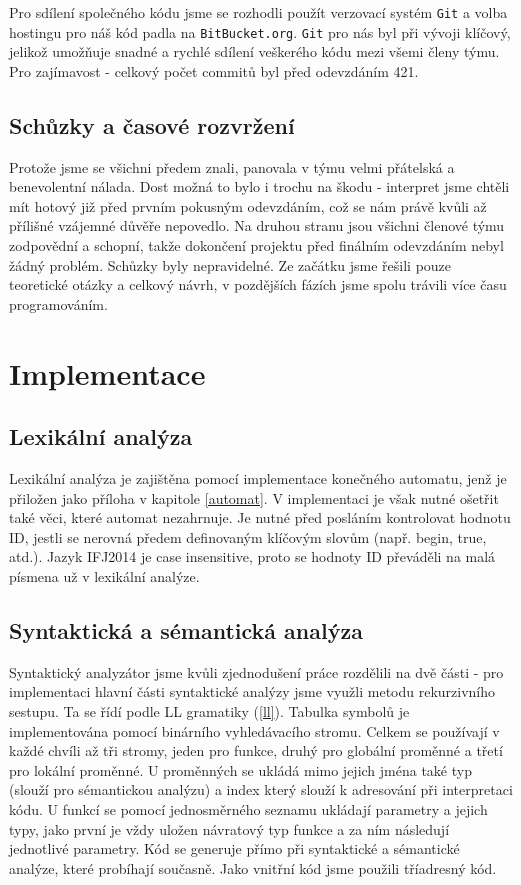 ﻿\documentclass[12pt]{article}
\begin{document}
Pro sdílení společného kódu jsme se rozhodli použít verzovací systém \verb|Git| a volba hostingu pro náš kód padla na \verb|BitBucket.org|. \verb|Git| pro nás byl při vývoji klíčový, jelikož umožňuje snadné a rychlé sdílení veškerého kódu mezi všemi členy týmu. Pro zajímavost - celkový počet commitů byl před odevzdáním 421.

\subsection{Schůzky a časové rozvržení}

Protože jsme se všichni předem znali, panovala v týmu velmi přátelská a benevolentní nálada. Dost možná to bylo i trochu na škodu - interpret jsme chtěli mít hotový již před prvním pokusným odevzdáním, což se nám právě kvůli až přílišné vzájemné důvěře nepovedlo. Na druhou stranu jsou všichni členové týmu zodpovědní a schopní, takže dokončení projektu před finálním odevzdáním nebyl žádný problém. Schůzky byly nepravidelné. Ze začátku jsme řešili pouze teoretické otázky a celkový návrh, v pozdějších fázích jsme spolu trávili více času programováním.

\newpage
\section{Implementace}

\subsection{Lexikální analýza}

Lexikální analýza je zajištěna pomocí implementace konečného automatu, jenž je přiložen jako příloha v kapitole \ref{automat}. V implementaci je však nutné ošetřit také věci, které automat nezahrnuje. Je nutné před posláním kontrolovat hodnotu ID, jestli se nerovná předem definovaným klíčovým slovům (např. begin, true, atd.). Jazyk IFJ2014 je case insensitive, proto se hodnoty ID převáděli na malá písmena už v lexikální analýze.

\subsection{Syntaktická a sémantická analýza}

Syntaktický analyzátor jsme kvůli zjednodušení práce rozdělili na dvě části - pro implementaci hlavní části syntaktické analýzy jsme využli metodu rekurzivního sestupu. Ta se řídí podle LL gramatiky (\ref{ll}). Tabulka symbolů je implementována pomocí binárního vyhledávacího stromu. Celkem se používají v každé chvíli až tři stromy, jeden pro funkce, druhý pro globální proměnné a třetí pro lokální proměnné. U proměnných se ukládá mimo jejich jména také typ (slouží pro sémantickou analýzu) a index který slouží k adresování při interpretaci kódu. U funkcí se pomocí jednosměrného seznamu ukládají parametry a jejich typy, jako první je vždy uložen návratový typ funkce a za ním následují jednotlivé parametry.
Kód se generuje přímo při syntaktické a sémantické analýze, které probíhají současně. Jako vnitřní kód jsme použili tříadresný kód.
\end{document}
